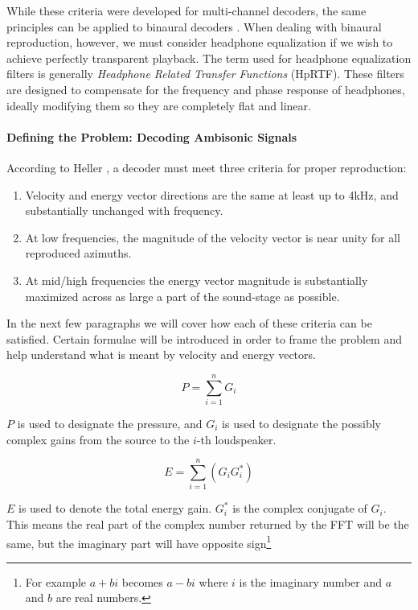 While these criteria were developed for multi-channel decoders, the same principles can be applied to binaural decoders \cite{gorzel2019efficient}. When dealing with binaural reproduction, however, we must consider headphone equalization if we wish to achieve perfectly transparent playback. The term used for headphone equalization filters is generally \textit{Headphone Related Transfer Functions} (HpRTF). These filters are designed to compensate for the frequency and phase response of headphones, ideally modifying them so they are completely flat and linear.

\paragraph{Defining the Problem: Decoding Ambisonic Signals}

According to Heller \cite{heller2008my}, a decoder must meet three criteria for proper reproduction: 

\begin{enumerate}
    \item Velocity and energy vector directions are the same at least up to 4kHz, and substantially unchanged with frequency. 
    \item At low frequencies, the magnitude of the velocity vector is near unity for all reproduced azimuths. 
    \item At mid/high frequencies the energy vector magnitude is substantially maximized across as large a part of the sound-stage as possible.  
\end{enumerate}

In the next few paragraphs we will cover how each of these criteria can be satisfied. Certain formulae will be introduced in order to frame the problem and help understand what is meant by velocity and energy vectors.

\begin{equation}
P=\sum_{i=1}^{n} G_{i}
\end{equation}

$P$ is used to designate the pressure, and $G_{i}$ is used to designate the possibly complex gains from the source to the $i$-th loudspeaker. 

\begin{equation}
E=\sum_{i=1}^{n}\left(G_{i} G_{i}^{*}\right)
\end{equation}

$E$ is used to denote the total energy gain. $G_{i}^{*}$ is the complex conjugate of $G_{i}$. This means the real part of the complex number returned by the FFT will be the same, but the imaginary part will have opposite sign\footnote{For example $a + bi$ becomes $a - bi$ where $i$ is the imaginary number and $a$ and $b$ are real numbers.}


